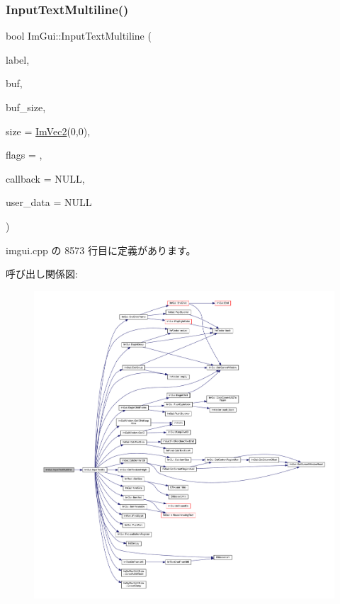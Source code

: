 \subsubsection{\texorpdfstring{Input\+Text\+Multiline()}{InputTextMultiline()}}
{\footnotesize\ttfamily bool Im\+Gui\+::\+Input\+Text\+Multiline (\begin{DoxyParamCaption}\item[{const char $\ast$}]{label,  }\item[{char $\ast$}]{buf,  }\item[{size\+\_\+t}]{buf\+\_\+size,  }\item[{const \mbox{\hyperlink{struct_im_vec2}{Im\+Vec2}} \&}]{size = {\ttfamily \mbox{\hyperlink{struct_im_vec2}{Im\+Vec2}}(0,0)},  }\item[{\mbox{\hyperlink{imgui_8h_a7d2c6153a6b9b5d3178ce82434ac9fb8}{Im\+Gui\+Input\+Text\+Flags}}}]{flags = {},  }\item[{\mbox{\hyperlink{imgui_8h_ae9254e6ad76a9bc7abc20929e07b29c5}{Im\+Gui\+Text\+Edit\+Callback}}}]{callback = {\ttfamily NULL},  }\item[{void $\ast$}]{user\+\_\+data = {\ttfamily NULL} }\end{DoxyParamCaption})}



 imgui.\+cpp の 8573 行目に定義があります。

呼び出し関係図\+:\nopagebreak
\begin{figure}[H]
\begin{center}
\leavevmode
\includegraphics[width=350pt]{namespace_im_gui_a94b4d241eafa1a4a077f98f5aee00dda_cgraph}
\end{center}
\end{figure}
\mbox{\label{namespace_im_gui_a22668d440cbbb1f8be07241d9c6d9096}} 

